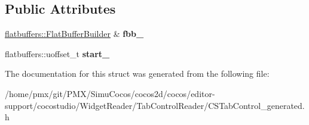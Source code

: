\subsection*{Public Attributes}
\begin{DoxyCompactItemize}
\item 
\mbox{\label{structflatbuffers_1_1TabControlOptionBuilder_ad156552022887abb0e75cd5e04137684}} 
\hyperlink{classflatbuffers_1_1FlatBufferBuilder}{flatbuffers\+::\+Flat\+Buffer\+Builder} \& {\bfseries fbb\+\_\+}
\item 
\mbox{\label{structflatbuffers_1_1TabControlOptionBuilder_acf91b3ee4e8df1ee73257b0d1ad1f49a}} 
flatbuffers\+::uoffset\+\_\+t {\bfseries start\+\_\+}
\end{DoxyCompactItemize}


The documentation for this struct was generated from the following file\+:\begin{DoxyCompactItemize}
\item 
/home/pmx/git/\+P\+M\+X/\+Simu\+Cocos/cocos2d/cocos/editor-\/support/cocostudio/\+Widget\+Reader/\+Tab\+Control\+Reader/C\+S\+Tab\+Control\+\_\+generated.\+h\end{DoxyCompactItemize}

